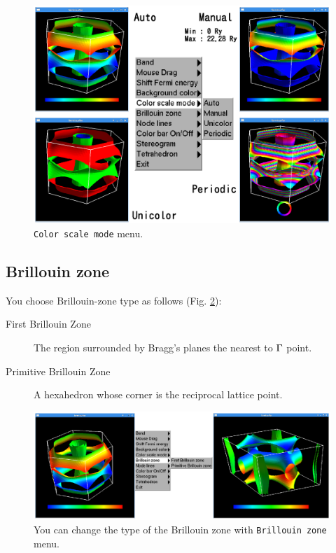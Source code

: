\documentclass[12pt]{article}
\begin{document}
\begin{figure}[!ht]
  \includegraphics[width=17cm]{figs/colorscale.eps}
  \caption{\texttt{Color scale mode} menu.}
  \label{fig_colorscale}
\end{figure}

\subsection{Brillouin zone}

You choose Brillouin-zone type as follows (Fig. \ref{fig_brillouinzone}): 
\begin{description}
\item[First Brillouin Zone] The region surrounded by Bragg's planes
  the nearest to ${\rm \Gamma}$ point.
\item[Primitive Brillouin Zone] A hexahedron 
  whose corner is the reciprocal lattice point.
\end{description}

\begin{figure}[!ht]
  \includegraphics[width=17cm]{figs/brillouinzone.eps}
  \caption{You can change the type of the Brillouin zone 
    with \texttt{Brillouin zone} menu.}
  \label{fig_brillouinzone}
\end{figure}
\end{document}
